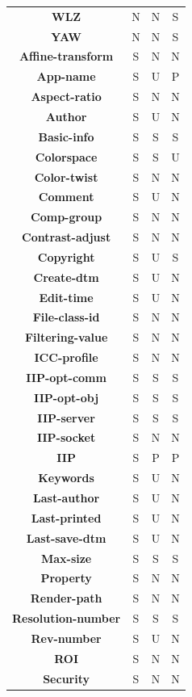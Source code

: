 \documentclass[11pt]{article}
\newcommand{\com}[1]{\textbf{#1}}
\begin{document}
\begin{table}[!hp]
{\begin{tabular}{|c|c|c|c|}
\com{WLZ}  & N & N & S \\
\com{YAW}  & N & N & S \\
\hline
\com{Affine-transform}  & S & N & N \\
\com{App-name}          & S & U & P \\
\com{Aspect-ratio}      & S & N & N \\
\com{Author}            & S & U & N \\
\com{Basic-info}        & S & S & S \\
\com{Colorspace}        & S & S & U \\
\com{Color-twist}       & S & N & N \\
\com{Comment}           & S & U & N \\
\com{Comp-group}        & S & N & N \\
\com{Contrast-adjust}   & S & N & N \\
\com{Copyright}         & S & U & S \\
\com{Create-dtm}        & S & U & N \\
\com{Edit-time}         & S & U & N \\
\com{File-class-id}     & S & N & N \\
\com{Filtering-value}   & S & N & N \\
\com{ICC-profile}       & S & N & N \\
\com{IIP-opt-comm}      & S & S & S \\
\com{IIP-opt-obj}       & S & S & S \\
\com{IIP-server}        & S & S & S \\
\com{IIP-socket}        & S & N & N \\
\com{IIP}               & S & P & P \\
\com{Keywords}          & S & U & N \\
\com{Last-author}       & S & U & N \\
\com{Last-printed}      & S & U & N \\
\com{Last-save-dtm}     & S & U & N \\
\com{Max-size}          & S & S & S \\
\com{Property}          & S & N & N \\
\com{Render-path}       & S & N & N \\
\com{Resolution-number} & S & S & S \\
\com{Rev-number}        & S & U & N \\
\com{ROI}               & S & N & N \\
\com{Security}          & S & N & N \\

\end{tabular}}
\end{table}
\end{document}
